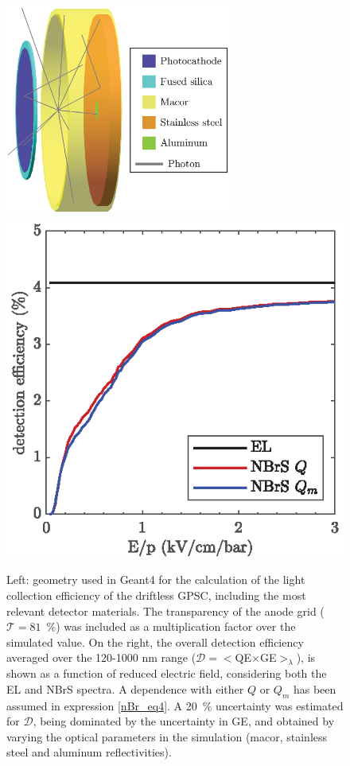 \documentclass[%
 reprint,
superscriptaddress,
 amsmath,amssymb,
 aps,
]{revtex4-2}
\begin{document}
\begin{figure}[tbp]
\centering %
\includegraphics[width=7.4cm,height=7cm,keepaspectratio]{Fig11a.eps}
\includegraphics[]{Fig11b.eps}
\hfill
\caption{\label{fig:QEGE}Left: geometry used in Geant4 for the calculation of the light collection efficiency of the driftless GPSC, including the most relevant detector materials. The transparency of the anode grid ($\mathcal{T}=81$~\%) was included as a multiplication factor over the simulated value. On the right, the overall detection efficiency averaged over the 120-1000 nm range ($\mathcal{D}=<$QE$\times$GE$>_\lambda$), is shown as a function of reduced electric field, considering both the EL and NBrS spectra. A dependence with either $Q$ or $Q_m$ has been assumed in expression \ref{nBr_eq4}. A 20~\% uncertainty was estimated for $\mathcal{D}$, being dominated by the uncertainty in GE, and obtained by varying the optical parameters in the simulation (macor, stainless steel and aluminum reflectivities).}
\end{figure}
\end{document}
